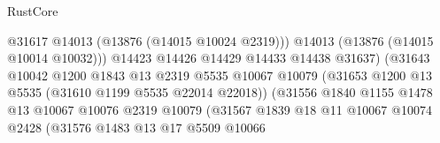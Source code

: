 \begin{lexlean}{RustCore}
\begin{coremodule}
                                                  @31617
                                                  @14013
                                                  (@13876 (@14015 @10024 @2319)))
                                                @14013
                                                (@13876 (@14015 @10014 @10032)))
                                              @14423
                                              @14426
                                              @14429
                                              @14433
                                              @14438
                                              @31637)
                                            (@31643
                                              @10042
                                              @1200
                                              @1843
                                              @13
                                              @2319
                                              @5535
                                              @10067
                                              @10079
                                              (@31653
                                                @1200
                                                @13
                                                @5535
                                                (@31610 @1199 @5535 @22014 @22018))
                                              (@31556
                                                @1840
                                                @1155
                                                @1478
                                                @13
                                                @10067
                                                @10076
                                                @2319
                                                @10079
                                                (@31567
                                                  @1839
                                                  @18
                                                  @11
                                                  @10067
                                                  @10074
                                                  @2428
                                                  (@31576
                                                    @1483
                                                    @13
                                                    @17
                                                    @5509
                                                    @10066

\end{coremodule}
\end{lexlean}
